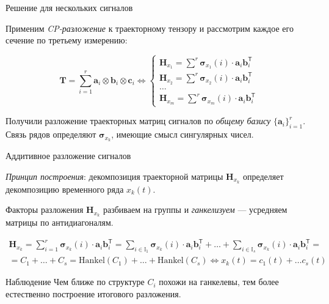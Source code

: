 \documentclass[10pt]{beamer}
\theoremstyle{definition}
\begin{document}
	\begin{frame}{Решение для нескольких сигналов}
		
		Применим \textit{CP-разложение} к траекторному тензору и рассмотрим каждое его сечение по третьему измерению:
		
		\begin{equation*}\label{eq:tSSA_decomp}
			\textbf{T} = \sum\limits_{i = 1}^{r} \mathbf{a}_i \otimes \mathbf{b}_i \otimes \mathbf{c}_i \Leftrightarrow \begin{cases}
				\mathbf{H}_{x_1} = \sum\limits^{r} \boldsymbol{\sigma}_{x_1}(i) \cdot \mathbf{a}_i  \mathbf{b}_i^{\mathsf{T}}  \\
				\mathbf{H}_{x_2} = \sum\limits^{r} \boldsymbol{\sigma}_{x_2}(i) \cdot \mathbf{a}_i  \mathbf{b}_i^{\mathsf{T}} \\
				\ldots \\
				\mathbf{H}_{x_m} = \sum\limits^{r} \boldsymbol{\sigma}_{x_m}(i) \cdot \mathbf{a}_i  \mathbf{b}_i^{\mathsf{T}} 
			\end{cases}
		\end{equation*}
		
		Получили разложение траекторных матриц сигналов по \emph{общему базису} $ \{\mathbf{a}_i\}_{i = 1}^r $. Связь рядов определяют $ \boldsymbol{\sigma}_{x_k} $, имеющие смысл сингулярных чисел.
		
	\end{frame}
	
	\begin{frame}{Аддитивное разложение сигналов}
		
		\textit{Принцип построения}: декомпозиция траекторной матрицы $ \mathbf{H}_{x_k} $ определяет декомпозицию временного ряда $ x_k(t) $.
		
		Факторы разложения $ \mathbf{H}_{x_k} $ разбиваем на группы и \emph{ганкелизуем} --- усредняем матрицы по антидиагоналям.
		
		\begin{multline*}
			\mathbf{H}_{x_k} = \sum\limits_{i = 1}^{r} \boldsymbol{\sigma}_{x_k}(i) \cdot \mathbf{a}_i  \mathbf{b}_i^{\mathsf{T}} = \sum\limits_{i \in \mathbb{I}_1} \boldsymbol{\sigma}_{x_k}(i) \cdot \mathbf{a}_i  \mathbf{b}_i^{\mathsf{T}} + \ldots + \sum\limits_{i \in \mathbb{I}_s} \boldsymbol{\sigma}_{x_k}(i) \cdot \mathbf{a}_i  \mathbf{b}_i^{\mathsf{T}} = \\ = C_1 + \ldots + C_s = \text{Hankel}(C_1) + \ldots + \text{Hankel}(C_s)  \Leftrightarrow x_k(t) = c_1(t) + \ldots c_s(t)
		\end{multline*}
		
		\begin{exampleblock}{Наблюдение}
			Чем ближе по структуре $ C_i $ похожи на ганкелевы, тем более естественно построение итогового разложения. 
		\end{exampleblock}
		
	\end{frame}
	
\end{document}
